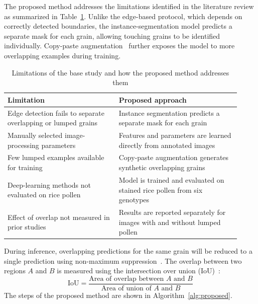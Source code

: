The proposed method addresses the limitations identified in the literature review as summarized in Table~\ref{tab:limitations}. Unlike the edge-based protocol, which depends on correctly detected boundaries, the instance-segmentation model predicts a separate mask for each grain, allowing touching grains to be identified individually. Copy-paste augmentation~\cite{ghiasi2021} further exposes the model to more overlapping examples during training.

\begin{table}[H]
    \centering
    \caption{Limitations of the base study and how the proposed method addresses them}
    \label{tab:limitations}
    \begin{tabular}{p{0.44\linewidth} p{0.48\linewidth}}
        \toprule
        \textbf{Limitation} & \textbf{Proposed approach} \\
        \midrule
        Edge detection fails to separate overlapping or lumped grains~\cite{go2019} & Instance segmentation predicts a separate mask for each grain \\
        Manually selected image-processing parameters~\cite{go2019} & Features and parameters are learned directly from annotated images \\
        Few lumped examples available for training & Copy-paste augmentation generates synthetic overlapping grains \\
        Deep-learning methods not evaluated on rice pollen~\cite{tan2022, li2026pvdt} & Model is trained and evaluated on stained rice pollen from six genotypes \\
        Effect of overlap not measured in prior studies & Results are reported separately for images with and without lumped pollen \\
        \bottomrule
    \end{tabular}
\end{table}

During inference, overlapping predictions for the same grain will be reduced to a single prediction using non-maximum suppression~\cite{neubeck2006nms}. The overlap between two regions $A$ and $B$ is measured using the intersection over union (IoU)~\cite{everingham2010pascal}:
\begin{equation}
    \mathrm{IoU} = \frac{\text{Area of overlap between } A \text{ and } B}{\text{Area of union of } A \text{ and } B}
    \label{eq:iou}
\end{equation}
The steps of the proposed method are shown in Algorithm~\ref{alg:proposed}.

